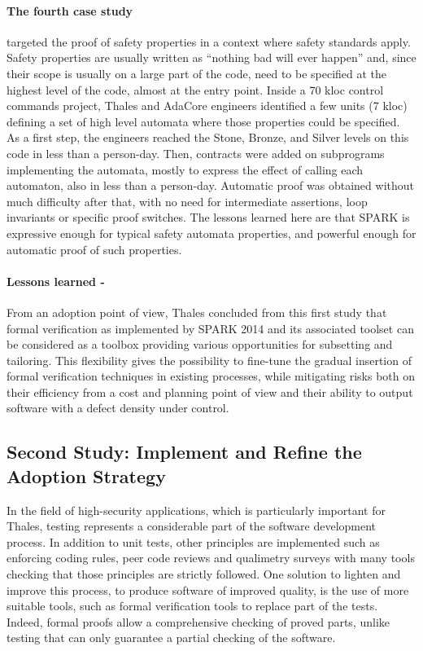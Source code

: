 \documentclass{llncs}
\begin{document}
\paragraph{The fourth case study} targeted the proof of safety properties in a context where
safety standards apply. Safety properties are usually written as “nothing bad
will ever happen” and, since their scope is usually on a large part of the
code, need to be specified at the highest level of the code, almost at the
entry point. Inside a 70 kloc control commands project, Thales and AdaCore
engineers identified a few units (7 kloc) defining a set of high level automata
where those properties could be specified.  As a first step, the engineers reached the
Stone, Bronze, and Silver levels on this code in less than a person-day. Then,
contracts were added on subprograms implementing the automata, mostly to
express the effect of calling each automaton, also in less than a
person-day. Automatic proof was obtained without much difficulty after that,
with no need for intermediate assertions, loop invariants or specific proof
switches. The lessons learned here are that SPARK is expressive enough for
typical safety automata properties, and powerful enough for automatic proof of
such properties.

\paragraph{Lessons learned -}
From an adoption point of view, Thales concluded from this first study that
formal verification as implemented by SPARK 2014 and its associated toolset can
be considered as a toolbox providing various opportunities for subsetting and
tailoring. This flexibility gives the possibility to fine-tune the gradual
insertion of formal verification techniques in existing processes, while
mitigating risks both on their efficiency from a cost and planning point of
view and their ability to output software with a defect density under control.

\subsection{Second Study: Implement and Refine the Adoption Strategy}

In the field of high-security applications, which is particularly important for
Thales, testing represents a considerable part of the software development
process. In addition to unit tests, other principles are implemented such as
enforcing coding rules, peer code reviews and qualimetry surveys with many
tools checking that those principles are strictly followed. One solution to
lighten and improve this process, to produce software of improved quality, is
the use of more suitable tools, such as formal verification tools to replace
part of the tests. Indeed, formal proofs allow a comprehensive checking of
proved parts, unlike testing that can only guarantee a partial checking of the
software.
\end{document}
